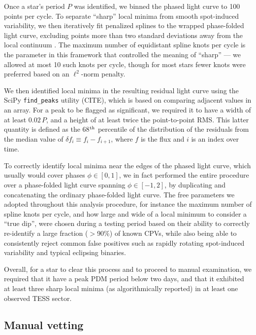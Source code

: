 \documentclass[11pt,twocolumn,tighten]{aastex63}
\begin{document}
Once a star's period $P$ was identified, we binned the phased light curve
to 100 points per cycle.  To separate ``sharp'' local minima from
smooth spot-induced variability, we then iteratively fit penalized
splines to the wrapped phase-folded light curve, excluding points more
than two standard deviations away from the local continuum
\citep{2019AJ....158..143H}.  The maximum number of equidistant spline
knots per cycle is the parameter in this framework that controlled the
meaning of ``sharp'' --- we allowed at most 10 such knots per cycle,
though for most stars fewer knots were preferred based on an
$\ell^2$-norm penalty. 

We then identified local minima in the resulting residual light curve
using the SciPy \texttt{find\_peaks} utility (CITE), which is based on
comparing adjacent
values in an array.  For a peak to be flagged as significant, we
required it to have a width of at least $0.02\,P$, and a height of at
least twice the point-to-point RMS.  This latter quantity is defined as
the 68$^{\rm th}$ percentile of the distribution of the residuals from
the median value of $\delta f_i \equiv f_i - f_{i+1}$, where $f$ is
the flux and $i$ is an index over time.

To correctly identify local minima near the edges of the phased light
curve, which usually would cover phases $\phi \in [ 0,1 ]$, we in fact
performed the entire procedure over a phase-folded light curve
spanning $\phi \in [-1,2 ]$, by duplicating and concatenating
the ordinary phase-folded light curve.
The free parameters we adopted throughout this analysis procedure, for
instance the maximum number of spline knots per cycle, and how large
and wide of a local minimum to consider a ``true dip'', were chosen
during a testing period based on their ability to correctly re-identify 
a large fraction ($>$90\%) of known CPVs, while also being able to
consistently reject common false positives such as rapidly rotating
spot-induced variability and typical eclipsing binaries.

Overall, for a star to clear this process and to proceed to manual
examination, we required that it have a peak PDM period below two
days, and that it exhibited at least three sharp local minima (as
algorithmically reported) in at least one observed TESS sector.


\subsection{Manual vetting}
\end{document}
